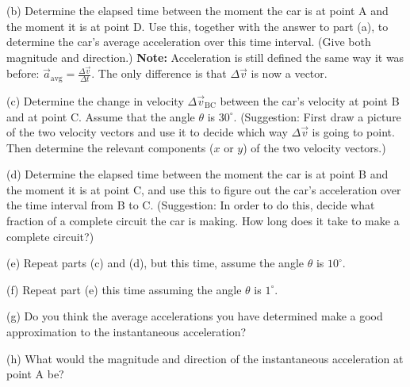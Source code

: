\vfil

(b) Determine the elapsed time between the moment the car is at point A
and the moment it is at point D.  Use this, together with the answer to part (a), to determine
the car's average acceleration over this time interval.  (Give both magnitude
and direction.)  {\bf Note:} Acceleration is still defined the same
way it was before: ${\vec a}_{\mathrm{avg}}=\frac{\Delta \vec v}{\Delta t}$.
The only difference is that $\Delta{\vec v}$ is now a vector.


\vfil\eject

(c) Determine the change in velocity $\Delta {\vec v}_\mathrm{BC}$ between the
car's velocity at point B and at point C.  Assume that the angle $\theta$
is $30^\circ$.  (Suggestion: First draw a picture of the two
velocity vectors and use it to decide which way
$\Delta{\vec v}$ is going to point.  Then determine the relevant
components ($x$ or $y$) of the two velocity vectors.)

\vfil

(d) Determine the elapsed time between the moment the car is at
point B and the moment it is at point C, and use this to figure out
the car's acceleration over the time interval from B to C.
(Suggestion: In order to do this, decide what fraction of a complete
circuit the car is making.  How long does it take to make a complete circuit?)

\vfil\eject

(e) Repeat parts (c) and (d), but this time, assume the angle $\theta$ is 
$10^\circ$.

\vfil

(f) Repeat part (e) this time assuming the angle $\theta$ is 
$1^\circ$.

\vfil

(g) Do you think the average accelerations you have determined make a good
approximation to the instantaneous acceleration?

\vskip 0.8in

(h) What would the magnitude and direction of the instantaneous acceleration
at point A be?

\vskip 0.8in\eject

